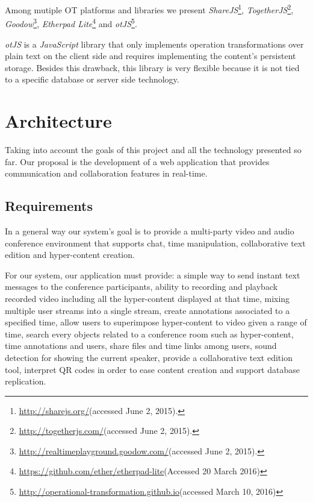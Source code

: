 \documentclass[conference,compsoc,a4paper]{IEEEtran}
\begin{document}
	Among mutiple \gls{OT} platforms and libraries we present \emph{ShareJS}\footnote{\url{http://sharejs.org/}(accessed June 2, 2015).}, \emph{TogetherJS}\footnote{\url{http://togetherjs.com/}(accessed June 2, 2015).}, \emph{Goodow}\footnote{\url{http://realtimeplayground.goodow.com/}(accessed June 2, 2015).}, \emph{Etherpad Lite}\footnote{\url{https://github.com/ether/etherpad-lite}(Accessed 20 March 2016)} and \emph{otJS}\footnote{\url{http://operational-transformation.github.io}(accessed March 10, 2016)}.


	\emph{otJS} is a \emph{JavaScript} library that only implements operation transformations over plain text on the client side and requires implementing the content's persistent storage. Besides this drawback, this library is very flexible because it is not tied to a specific database or server side technology.
        


\section{Architecture}
\label{chapter:architecture}

Taking into account the goals of this project and all the technology presented so far. Our proposal is the development of a web application that provides communication and collaboration features in real-time.

\subsection{Requirements}
In a general way our system's goal is to provide a multi-party video and audio conference environment that supports chat, time manipulation, collaborative text edition and hyper-content creation.


For our system, our application must provide: a simple way to send instant text messages to the conference participants, ability to recording and playback recorded video including all the hyper-content displayed at that time, mixing multiple user streams into a single stream, create annotations associated to a specified time, allow users to superimpose hyper-content to video given a range of time, search every objects related to a conference room such as hyper-content, time annotations and users, share files and time links among users, sound detection for showing the current speaker, provide a collaborative text edition tool, interpret \gls{QR} codes in order to ease content creation and support database replication.
\end{document}
